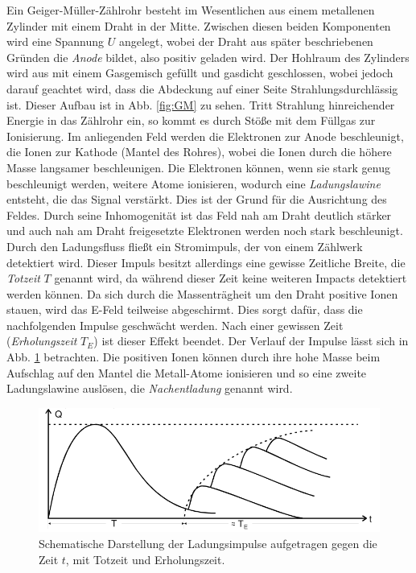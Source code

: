 Ein Geiger-Müller-Zählrohr besteht im Wesentlichen aus einem metallenen Zylinder mit einem Draht in der Mitte. Zwischen diesen beiden Komponenten wird eine Spannung $U$ angelegt, wobei der Draht aus später beschriebenen Gründen die \textit{Anode} bildet, also positiv geladen wird. Der Hohlraum des Zylinders wird aus mit einem Gasgemisch gefüllt und gasdicht geschlossen, wobei jedoch darauf geachtet wird, dass die Abdeckung auf einer Seite Strahlungsdurchlässig ist. Dieser Aufbau ist in Abb. \ref{fig:GM} zu sehen. Tritt Strahlung hinreichender Energie in das Zählrohr ein, so kommt es durch Stöße mit dem Füllgas zur Ionisierung. Im anliegenden Feld werden die Elektronen zur Anode beschleunigt, die Ionen zur Kathode (Mantel des Rohres), wobei die Ionen durch die höhere Masse langsamer beschleunigen. Die Elektronen können, wenn sie stark genug beschleunigt werden, weitere Atome ionisieren, wodurch eine \textit{Ladungslawine} entsteht, die das Signal verstärkt. Dies ist der Grund für die Ausrichtung des Feldes. Durch seine Inhomogenität ist das Feld nah am Draht deutlich stärker und auch nah am Draht freigesetzte Elektronen werden noch stark beschleunigt. Durch den Ladungsfluss fließt ein Stromimpuls, der von einem Zählwerk detektiert wird.
Dieser Impuls besitzt allerdings eine gewisse Zeitliche Breite, die \textit{Totzeit} $T$ genannt wird, da während dieser Zeit keine weiteren Impacts detektiert werden können. Da sich durch die Massenträgheit um den Draht positive Ionen stauen, wird das E-Feld teilweise abgeschirmt. Dies sorgt dafür, dass die nachfolgenden Impulse geschwächt werden. Nach einer gewissen Zeit (\textit{Erholungszeit} $T_E$) ist dieser Effekt beendet. Der Verlauf der Impulse lässt sich in Abb. \ref{fig:GM-Zeit} betrachten. Die positiven Ionen können durch ihre hohe Masse beim Aufschlag auf den Mantel die Metall-Atome ionisieren und so eine zweite Ladungslawine auslösen, die \textit{Nachentladung} genannt wird.

\begin{figure}
  \centering
  \includegraphics[heigth=5cm]{./logos/GM-Zeit.PNG}
  \caption{Schematische Darstellung der Ladungsimpulse aufgetragen gegen die Zeit $t$, mit Totzeit und Erholungszeit. \cite{Anleitung}}
  \label{fig:GM-Zeit}
\end{figure}

